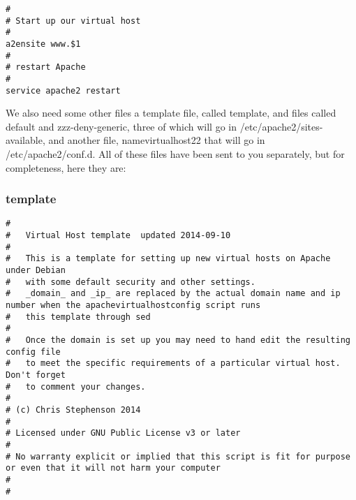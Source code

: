 \documentclass[12pt, a4paper]{article}
\begin{document}
\begin{verbatim}
#
# Start up our virtual host
#
a2ensite www.$1
#
# restart Apache
#
service apache2 restart 
\end{verbatim}



We also need some other files a template file, called template, and files called default and zzz-deny-generic, three of which will go in /etc/apache2/sites-available, and another file, namevirtualhost22 that will go in /etc/apache2/conf.d. All of these files have been sent to you separately, but for completeness, here they are:

\subsubsection*{template}
\begin{verbatim}
#
#   Virtual Host template  updated 2014-09-10
#
#   This is a template for setting up new virtual hosts on Apache under Debian
#   with some default security and other settings.
#   _domain_ and _ip_ are replaced by the actual domain name and ip number when the apachevirtualhostconfig script runs
#   this template through sed
#
#   Once the domain is set up you may need to hand edit the resulting config file
#   to meet the specific requirements of a particular virtual host. Don't forget
#   to comment your changes. 
#
# (c) Chris Stephenson 2014
#
# Licensed under GNU Public License v3 or later
#
# No warranty explicit or implied that this script is fit for purpose or even that it will not harm your computer 
#
# 



\end{verbatim}
\end{document}
